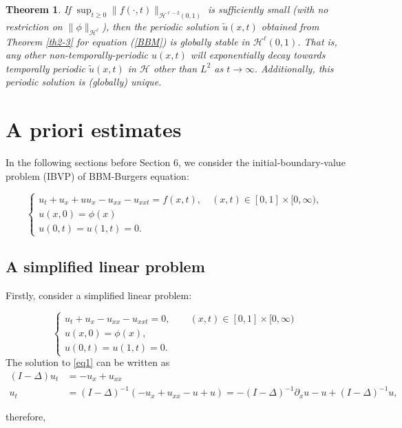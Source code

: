 \documentclass[10pt,a4paper,final]{article}
\numberwithin{equation}{section}
\newtheorem{theorem}{Theorem}[section]
\newcommand{\cH}{\mathcal{H}}
\begin{document}
\begin{theorem}\label{th2-4}
If $\sup_{t\geq 0}\|f(\cdot,t)\|_{\cH^{\ell-2}(0,1)}$ is sufficiently small (with no restriction on $\|\phi\|_{\cH^{\ell}}$), then the periodic solution $\tilde u(x,t)$ obtained from Theorem \ref{th2-3} for equation (\ref{BBM}) is globally stable in $\cH^{\ell}(0,1)$. That is, any other non-temporally-periodic $u(x,t)$ will exponentially decay towards temporally periodic $\tilde u(x,t)$ in $\mathcal{H}$ other than $L^2$ as $t\rightarrow \infty.$ Additionally, this periodic solution is (globally) unique. 
\end{theorem}

\section{A priori estimates}
In the following sections before Section 6, we consider the initial-boundary-value problem (IBVP) of BBM-Burgers equation:

\begin{equation}\label{eqmain}
\begin{cases}
    u_t+u_x+uu_x-u_{xx}-u_{xxt}=f(x,t),  \quad (x, t)\in [0,1]\times [0, \infty),&\\
    u(x,0)=\phi(x) &\\
    u(0,t)=u(1,t)=0.&
    \end{cases}
\end{equation}
\subsection{A simplified linear problem}
Firstly, consider a simplified linear problem:

\begin{equation} \label{eq1}
\begin{cases}
    u_t+u_x-u_{xx}-u_{xxt}=0, \quad\quad (x, t)\in [0,1]\times [0, \infty)&\\
    u(x,0)=\phi(x), &\\
    u(0,t)=u(1,t)=0. &
\end{cases}
\end{equation}
The solution to \eqref{eq1} can be written as 
\begin{align*}
    (I-\Delta)u_t&=-u_x+u_{xx}\\
    u_t &= (I-\Delta)^{-1}(-u_x+u_{xx}-u+u)=-(I-\Delta)^{-1}\partial_xu-u+(I-\Delta)^{-1}u,
\end{align*}

therefore, 
\end{document}
